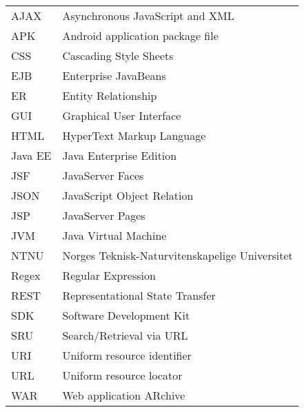 \documentclass[../main.tex]{subfiles}
\begin{document}
\begin{tabular}{ p{2cm} l  }
AJAX	 & Asynchronous JavaScript and XML\\
APK & Android application package file\\
CSS & Cascading Style Sheets\\
EJB & Enterprise JavaBeans\\
ER & Entity Relationship\\
GUI & Graphical User Interface\\
HTML & HyperText Markup Language\\
Java EE & Java Enterprise Edition\\
JSF & JavaServer Faces\\
JSON & JavaScript Object Relation\\
JSP & JavaServer Pages\\
JVM & Java Virtual Machine\\
NTNU & Norges Teknisk-Naturvitenskapelige Universitet\\
Regex & Regular Expression\\
REST & Representational State Transfer\\
SDK & Software Development Kit\\
SRU & Search/Retrieval via URL\\
URI & Uniform resource identifier\\
URL & Uniform resource locator\\
WAR & Web application ARchive\\
\end{tabular}


\newpage
\end{document}
